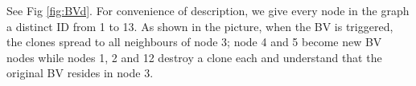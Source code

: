 See Fig \ref{fig:BVd}. For convenience of description, we give every node in the graph a distinct ID from 1 to 13. As shown in the picture, when the BV is triggered, the clones spread to all neighbours of node 3;  node 4 and 5 become new BV nodes while nodes 1, 2 and 12 destroy a clone each and understand  that the original BV resides in node 3. 
%
\begin{figure} [H]
  \centering 
    \hspace{1in} 

\end{figure}
